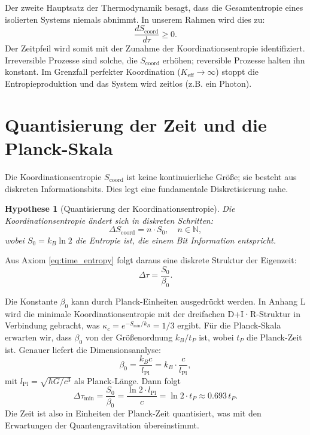 \documentclass[12pt,a4paper]{article}
\newtheorem{hypothesis}[theorem]{Hypothese}
\newcommand{\Keff}{K_{\mathrm{eff}}}
\newcommand{\kappac}{\kappa_c}
\newcommand{\Lpl}{l_{\mathrm{Pl}}}
\newcommand{\Scoord}{S_{\mathrm{coord}}}
\begin{document}
	Der zweite Hauptsatz der Thermodynamik besagt, dass die Gesamtentropie eines isolierten Systems niemals abnimmt. In unserem Rahmen wird dies zu:
	\begin{equation}
		\frac{d\Scoord}{d\tau} \ge 0.
	\end{equation}
	Der Zeitpfeil wird somit mit der Zunahme der Koordinationsentropie identifiziert. Irreversible Prozesse sind solche, die \(\Scoord\) erhöhen; reversible Prozesse halten ihn konstant. Im Grenzfall perfekter Koordination (\(\Keff \to \infty\)) stoppt die Entropieproduktion und das System wird zeitlos (z.B. ein Photon).
	
	\section{Quantisierung der Zeit und die Planck-Skala}
	\label{sec:quantization}
	
	Die Koordinationsentropie \(\Scoord\) ist keine kontinuierliche Größe; sie besteht aus diskreten Informationsbits. Dies legt eine fundamentale Diskretisierung nahe.
	
	\begin{hypothesis}[Quantisierung der Koordinationsentropie]
		Die Koordinationsentropie ändert sich in diskreten Schritten:
		\begin{equation}
			\Delta \Scoord = n \cdot S_0, \quad n \in \mathbb{N},
		\end{equation}
		wobei \(S_0 = k_B \ln 2\) die Entropie ist, die einem Bit Information entspricht.
	\end{hypothesis}
	
	Aus Axiom \ref{eq:time_entropy} folgt daraus eine diskrete Struktur der Eigenzeit:
	\begin{equation}
		\Delta \tau = \frac{S_0}{\beta_0}.
	\end{equation}
	
	Die Konstante \(\beta_0\) kann durch Planck-Einheiten ausgedrückt werden. In Anhang L wird die minimale Koordinationsentropie mit der dreifachen D+I·R-Struktur in Verbindung gebracht, was \(\kappac = e^{-S_{\min}/k_B} = 1/3\) ergibt. Für die Planck-Skala erwarten wir, dass \(\beta_0\) von der Größenordnung \(k_B / t_P\) ist, wobei \(t_P\) die Planck-Zeit ist. Genauer liefert die Dimensionsanalyse:
	\begin{equation}
		\beta_0 = \frac{k_B c}{\Lpl} = k_B \cdot \frac{c}{\Lpl},
	\end{equation}
	mit \(\Lpl = \sqrt{\hbar G/c^3}\) als Planck-Länge. Dann folgt
	\begin{equation}
		\Delta \tau_{\min} = \frac{S_0}{\beta_0} = \frac{\ln 2 \cdot \Lpl}{c} = \ln 2 \cdot t_P \approx 0.693 \, t_P.
	\end{equation}
	Die Zeit ist also in Einheiten der Planck-Zeit quantisiert, was mit den Erwartungen der Quantengravitation übereinstimmt.
	
\end{document}
